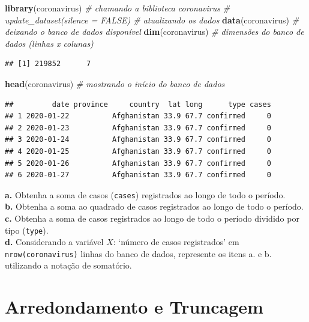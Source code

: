 \documentclass[
]{book}
\newenvironment{Shaded}{\begin{snugshade}}{\end{snugshade}}
\newcommand{\CommentTok}[1]{\textcolor[rgb]{0.56,0.35,0.01}{\textit{#1}}}
\newcommand{\KeywordTok}[1]{\textcolor[rgb]{0.13,0.29,0.53}{\textbf{#1}}}
\newcommand{\NormalTok}[1]{#1}
\theoremstyle{definition}
\theoremstyle{definition}
\theoremstyle{definition}
\theoremstyle{remark}
\begin{document}
\begin{Shaded}
\begin{Highlighting}[]
\KeywordTok{library}\NormalTok{(coronavirus)    }\CommentTok{\# chamando a biblioteca \textquotesingle{}coronavirus\textquotesingle{}}
\CommentTok{\# update\_dataset(silence = FALSE)  \# atualizando os dados}
\KeywordTok{data}\NormalTok{(coronavirus)       }\CommentTok{\# deixando o banco de dados disponível}
\KeywordTok{dim}\NormalTok{(coronavirus)        }\CommentTok{\# dimensões do banco de dados (linhas x colunas)}
\end{Highlighting}
\end{Shaded}

\begin{verbatim}
## [1] 219852      7
\end{verbatim}

\begin{Shaded}
\begin{Highlighting}[]
\KeywordTok{head}\NormalTok{(coronavirus)       }\CommentTok{\# mostrando o início do banco de dados}
\end{Highlighting}
\end{Shaded}

\begin{verbatim}
##         date province     country  lat long      type cases
## 1 2020-01-22          Afghanistan 33.9 67.7 confirmed     0
## 2 2020-01-23          Afghanistan 33.9 67.7 confirmed     0
## 3 2020-01-24          Afghanistan 33.9 67.7 confirmed     0
## 4 2020-01-25          Afghanistan 33.9 67.7 confirmed     0
## 5 2020-01-26          Afghanistan 33.9 67.7 confirmed     0
## 6 2020-01-27          Afghanistan 33.9 67.7 confirmed     0
\end{verbatim}

\textbf{a.} Obtenha a soma de casos (\texttt{cases}) registrados ao longo de todo o período.\\
\textbf{b.} Obtenha a soma ao quadrado de casos registrados ao longo de todo o período.\\
\textbf{c.} Obtenha a soma de casos registrados ao longo de todo o período dividido por tipo (\texttt{type}).\\
\textbf{d.} Considerando a variável \(X\): `número de casos registrados' em \texttt{nrow(coronavirus)} linhas do banco de dados, represente os itens a. e b. utilizando a notação de somatório.

\hypertarget{arredondamento-e-truncagem}{%
\section{Arredondamento e Truncagem}\label{arredondamento-e-truncagem}}
\end{document}
